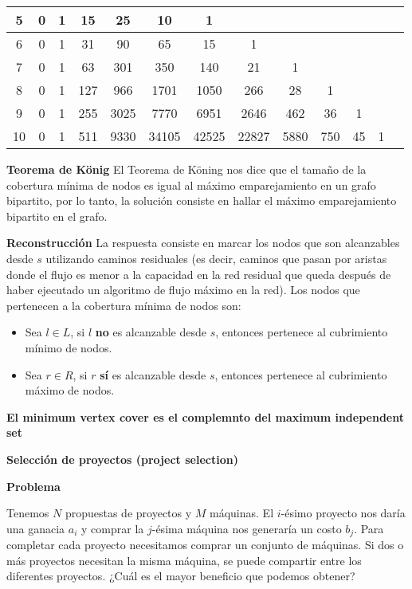 {\begin{center}
\begin{tabular} {|c|c|c|c|c|c|c|c|c|c|c|c|c|}
       \hline
        5  & 0 & 1  & 15 & 25 & 10 &  1 &   &   &    &   &   \\
       \hline
        6  & 0 & 1  & 31 & 90 & 65 &  15 & 1  &   &    &   &   \\
       \hline
        7  & 0 & 1  & 63 & 301 & 350 &  140 & 21  & 1 &    &   &   \\
       \hline
        8  & 0 & 1  & 127 & 966 & 1701 & 1050 &  266  & 28 & 1  &   &   \\
       \hline
        9  & 0 & 1  & 255 & 3025 & 7770 &  6951 & 2646  & 462 & 36  &
        1&   \\
       \hline
        10  & 0 & 1  & 511 & 9330 & 34105 & 42525 & 22827  & 5880
            & 750  & 45 &  1 \\
        \hline
    \end{tabular}
  \end{center}

  \textbf{Teorema de König} El Teorema de Köning nos dice que el tamaño de la
  cobertura mínima de nodos es igual al máximo emparejamiento en un grafo bipartito, por lo tanto, la solución consiste en hallar el máximo emparejamiento bipartito en el grafo.

  \textbf{Reconstrucción} La respuesta consiste en marcar los nodos que son
  alcanzables desde $s$ utilizando caminos residuales (es decir, caminos que
  pasan por aristas donde el flujo es menor a la capacidad en la red residual
  que queda después de haber ejecutado un algoritmo de flujo máximo en la
  red). Los nodos que pertenecen a la cobertura mínima de nodos son:
  \begin{itemize}
    \item Sea $l \in L$, si $l$ \textbf{no} es alcanzable desde $s$, entonces
      pertenece al cubrimiento mínimo de nodos.
    \item Sea $r \in R$, si $r$ \textbf{sí} es alcanzable desde $s$, entonces
      pertenece al cubrimiento máximo de nodos.
\end{itemize}

  \textbf{El minimum vertex cover es el complemnto del maximum independent
  set}

  \textbf{Selección de proyectos (project selection)}

  \textbf{Problema}

  Tenemos $N$ propuestas de proyectos y $M$ máquinas. El $i$-ésimo proyecto
  nos daría una ganacia $a_i$ y comprar la $j$-ésima máquina nos generaría un
  costo $b_j$. Para completar cada proyecto necesitamos comprar un conjunto de
  máquinas. Si dos o más proyectos necesitan la misma máquina, se puede
  compartir entre los diferentes proyectos. ¿Cuál es el mayor beneficio que
  podemos obtener?

}
